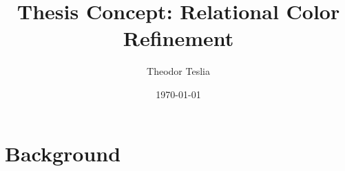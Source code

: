 \documentclass[a4paper,11pt,DIV=15]{scrartcl} %
\theoremstyle{plain}
\theoremstyle{definition}
\begin{document}
\subtitle{}
\date{\today}
\publishers{RWTH Aachen University}	%

\title{Thesis Concept: Relational Color Refinement}

\author{Theodor Teslia}

\maketitle

\section{Background}
\end{document}
